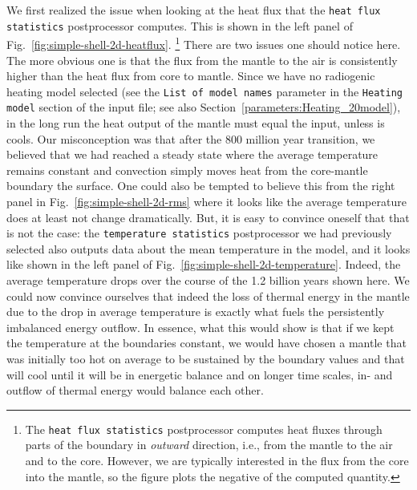\documentclass{article}
\begin{document}
We first realized the issue when looking at the heat flux that the
\texttt{heat flux statistics} postprocessor computes. This is shown in the left
panel of Fig.~\ref{fig:simple-shell-2d-heatflux}.%
\footnote{The \texttt{heat flux statistics} postprocessor computes heat fluxes
through parts of the boundary in \textit{outward} direction, i.e., from the
mantle to the air and to the core. However, we are typically interested in the
flux from the core into the mantle, so the figure plots the negative of the
computed quantity.}
There are two issues one should notice here.
The more obvious one is that the flux from the mantle to the air is consistently
higher than the heat flux from core to mantle. Since we have no radiogenic
heating model selected (see the \texttt{List of model names}
parameter in the \texttt{Heating model} section of the input file; see also
Section~\ref{parameters:Heating_20model}), in the long run the heat output
of the mantle must equal the input, unless is cools. Our misconception was that
after the 800 million year transition, we believed that we had reached a steady
state where the average temperature remains constant and convection simply
moves heat from the core-mantle boundary the surface. One could also be tempted
to believe this from the right panel in Fig.~\ref{fig:simple-shell-2d-rms} where
it looks like the average temperature does at least not change dramatically.
But, it is easy to convince oneself that that is not the case: the
\texttt{temperature statistics} postprocessor we had previously selected also
outputs data about the mean temperature in the model, and it looks like shown in
the left panel of Fig.~\ref{fig:simple-shell-2d-temperature}. Indeed, the
average temperature drops over the course of the 1.2 billion years shown here.
We could now convince ourselves that indeed the loss of thermal
energy in the mantle due to the drop in average temperature is exactly what
fuels the persistently imbalanced energy outflow. In essence, what this would
show is that if we kept the temperature at the boundaries constant, we would
have chosen a mantle that was initially too hot on average to be sustained by
the boundary values and that will cool until it will be in energetic balance and
on longer time scales, in- and outflow of thermal energy would balance each
other.
\end{document}
